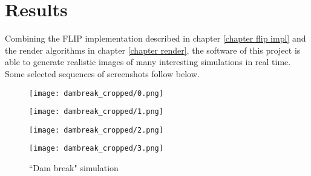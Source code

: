 \chapter{Results}

Combining the FLIP implementation described in chapter \ref{chapter flip impl} and the render algorithms in chapter \ref{chapter render}, the software of this project is able to generate realistic images of many interesting simulations in real time. Some selected sequences of screenshots follow below.



\begin{figure}[H]
    \centering
    
    \begin{minipage}[t]{.24\linewidth}
        \centering
        \vspace{0pt}
        \texttt{[image: dambreak\_cropped/0.png]}
    \end{minipage}
    \begin{minipage}[t]{.24\linewidth}
        \centering
        \vspace{0pt}
        \texttt{[image: dambreak\_cropped/1.png]}
    \end{minipage}
    \begin{minipage}[t]{.24\linewidth}
        \centering
        \vspace{0pt}
        \texttt{[image: dambreak\_cropped/2.png]}
    \end{minipage}
    \begin{minipage}[t]{.24\linewidth}
        \centering
        \vspace{0pt}
        \texttt{[image: dambreak\_cropped/3.png]}
    \end{minipage}

    \caption{``Dam break" simulation}
    \label{fig dambreak}
\end{figure}

